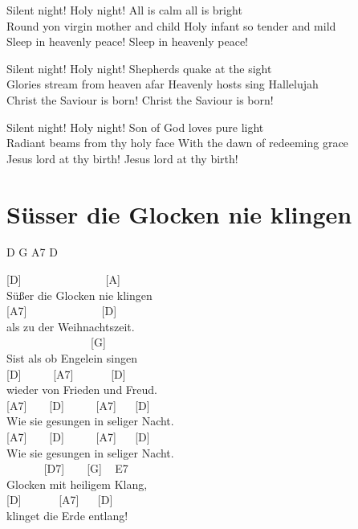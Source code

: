 \documentclass[
  letterpaper,
]{scrbook}
\begin{document}
Silent night! Holy night! All is calm all is bright\\
Round yon virgin mother and child Holy infant so tender and mild\\
Sleep in heavenly peace! Sleep in heavenly peace!

Silent night! Holy night! Shepherds quake at the sight\\
Glories stream from heaven afar Heavenly hosts sing Hallelujah\\
Christ the Saviour is born! Christ the Saviour is born!

Silent night! Holy night! Son of God love\textquotesingle s pure light\\
Radiant beams from thy holy face With the dawn of redeeming grace\\
Jesus lord at thy birth! Jesus lord at thy birth!

\hypertarget{suxfcsser-die-glocken-nie-klingen}{%
\chapter{Süsser die Glocken nie
klingen}\label{suxfcsser-die-glocken-nie-klingen}}

D G A7 D

{[}D{]} ~ ~ ~ ~ ~ ~ ~ ~ ~{[}A{]}\\
Süßer die Glocken nie klingen\\
{[}A7{]} ~ ~ ~ ~ ~ ~ ~ ~{[}D{]}\\
als zu der Weihnachtszeit.\\
\hspace*{0.333em} ~ ~ ~ ~ ~ ~ ~ ~ ~ {[}G{]}\\
S\textquotesingle ist als ob Engelein singen\\
{[}D{]} ~ ~ ~ {[}A7{]} ~ ~ ~ ~{[}D{]}\\
wieder von Frieden und Freud\textquotesingle.\\
{[}A7{]} ~ ~ {[}D{]} ~ ~ ~ {[}A7{]} ~ ~{[}D{]}\\
Wie sie gesungen in seliger Nacht.\\
{[}A7{]} ~ ~ {[}D{]} ~ ~ ~ {[}A7{]} ~ ~{[}D{]}\\
Wie sie gesungen in seliger Nacht.\\
\hspace*{0.333em} ~ ~ ~ ~ {[}D7{]} ~ ~ {[}G{]} ~ E7\\
Glocken mit heiligem Klang,\\
{[}D{]} ~ ~ ~ ~{[}A7{]} ~ ~{[}D{]}\\
klinget die Erde entlang!
\end{document}
